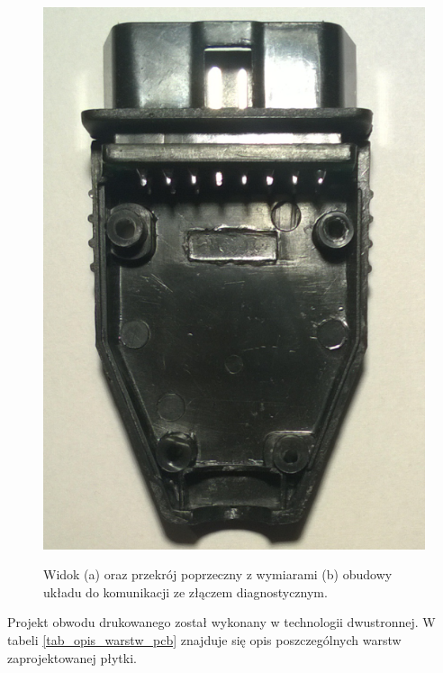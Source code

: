 \documentclass[12pt]{article} %
\numberwithin{equation}{subsection}
\numberwithin{figure}{section}
\numberwithin{table}{section}
\begin{document}
\begin{figure}[!h]
{				\includegraphics[scale=0.3]{Images/widok_wtyczka_obd.png}
			} 
			\caption{Widok (a) oraz przekrój poprzeczny z wymiarami (b) obudowy układu do komunikacji ze złączem diagnostycznym.}
			\label{widok_wtyczka_obd}
		\end{figure} 
	
	Projekt obwodu drukowanego został wykonany w technologii dwustronnej. W tabeli \ref{tab_opis_warstw_pcb} znajduje się opis poszczególnych warstw zaprojektowanej płytki.
	
\end{document}
